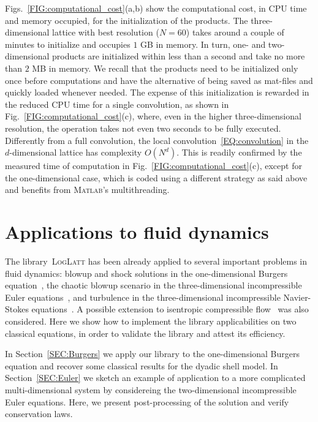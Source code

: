 \documentclass[12pt]{article}
\theoremstyle{definition}
\begin{document}
	Figs.~\ref{FIG:computational_cost}(a,b) show the computational cost, in CPU time and memory occupied, for the initialization of the products.
	The three-dimensional lattice with best resolution ($N = 60$) takes around a couple of minutes to initialize and occupies $1$ GB in memory.
	In turn, one- and two-dimensional products are initialized within less than a second and take no more than $2$ MB in memory.
	We recall that the products need to be initialized only once before computations and have the alternative of being saved as mat-files and quickly loaded whenever needed.
	The expense of this initialization is rewarded in the reduced CPU time for a single convolution, as shown in Fig.~\ref{FIG:computational_cost}(c), where, even in the higher three-dimensional resolution, the operation takes not even two seconds to be fully executed.
	Differently from a full convolution, the local convolution~\eqref{EQ:convolution} in the $d$-dimensional lattice has complexity $O(N^d)$. This is readily confirmed by the measured time of computation in Fig.~\ref{FIG:computational_cost}(c), except for the one-dimensional case, which is coded using a different strategy as said above and benefits from \textsc{Matlab}'s multithreading.
	
	\section{Applications to fluid dynamics}\label{SEC:fluid}
	
	The library~\textsc{LogLatt} has been already applied to several important problems in fluid dynamics: blowup and shock solutions in the one-dimensional Burgers equation~\cite{campolina2019fluid}, the chaotic blowup scenario in the three-dimensional incompressible Euler equations~\cite{campolina2018chaotic,campolina2021fluid}, and turbulence in the three-dimensional incompressible Navier-Stokes equations~\cite{campolina2021fluid}.
	A possible extension to isentropic compressible flow~\cite{campolina2021fluid} was also considered.
	Here we show how to implement the library applicabilities on two classical equations, in order to validate the library and attest its efficiency.
	
	In Section~\ref{SEC:Burgers} we apply our library to the one-dimensional Burgers equation and recover some classical results for the dyadic shell model.
	In Section~\ref{SEC:Euler} we sketch an example of application to a more complicated multi-dimensional system by considereing the two-dimensional incompressible Euler equations.
	Here, we present post-processing of the solution and verify conservation laws.
	
\end{document}
